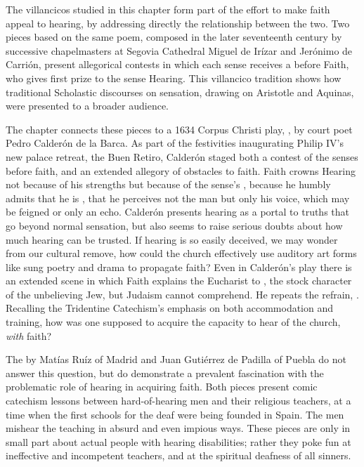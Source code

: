 \documentclass[tt]{vcbook-proposal}
\begin{document}
The villancicos studied in this chapter form part of the effort to make faith appeal to hearing, by addressing directly the relationship between the two.
Two pieces based on the same poem, composed in the later seventeenth century by successive chapelmasters at Segovia Cathedral Miguel de Irízar and Jerónimo de Carrión, present allegorical contests in which each sense receives a  before Faith, who gives first prize to the sense Hearing.
This villancico tradition shows how traditional Scholastic discourses on sensation, drawing on Aristotle and Aquinas, were presented to a broader audience.

The chapter connects these pieces to a 1634 Corpus Christi play, , by court poet Pedro Calderón de la Barca.
As part of the festivities inaugurating Philip IV's new palace retreat, the Buen Retiro, Calderón staged both a contest of the senses before faith, and an extended allegory of obstacles to faith.
Faith crowns Hearing not because of his strengths but because of the sense's , because he humbly admits that he is , that he perceives not the man but only his voice, which may be feigned or only an echo.
Calderón presents hearing as a portal to truths that go beyond normal sensation, but also seems to raise serious doubts about how much hearing can be trusted.
If hearing is so easily deceived, we may wonder from our cultural remove, how could the church effectively use auditory art forms like sung poetry and drama to propagate faith?
Even in Calderón's play there is an extended scene in which Faith explains the Eucharist to  , the stock character of the unbelieving Jew, but Judaism cannot comprehend.
He repeats the refrain, .
Recalling the Tridentine Catechism's emphasis on both accommodation and training, how was one supposed to acquire the capacity to hear  of the church, \emph{with} faith?

The  by Matías Ruíz of Madrid and Juan Gutiérrez de Padilla of Puebla do not answer this question, but do demonstrate a prevalent fascination with the problematic role of hearing in acquiring faith.
Both pieces present comic catechism lessons between hard-of-hearing men and their religious teachers, at a time when the first schools for the deaf were being founded in Spain.
The  men mishear the teaching in absurd and even impious ways.
These pieces are only in small part about actual people with hearing disabilities; rather they poke fun at ineffective and incompetent teachers, and at the spiritual deafness of all sinners.
\end{document}
